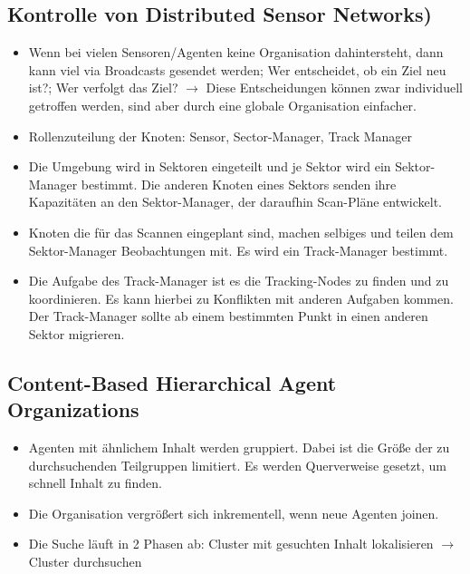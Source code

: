\documentclass{article} %
\begin{document}
	\subsection{Kontrolle von Distributed Sensor Networks)}
		\begin{itemize}
		\item Wenn bei vielen Sensoren/Agenten keine Organisation dahintersteht, dann kann viel via Broadcasts gesendet werden; Wer entscheidet, ob ein Ziel neu ist?; Wer verfolgt das Ziel? $\rightarrow$ Diese Entscheidungen können zwar individuell getroffen werden, sind aber durch eine globale Organisation einfacher.
		\item Rollenzuteilung der Knoten: Sensor, Sector-Manager, Track Manager
		\item Die Umgebung wird in Sektoren eingeteilt und je Sektor wird ein Sektor-Manager bestimmt. Die anderen Knoten eines Sektors senden ihre Kapazitäten an den Sektor-Manager, der daraufhin Scan-Pläne entwickelt.
		\item Knoten die für das Scannen eingeplant sind, machen selbiges und teilen dem Sektor-Manager Beobachtungen mit. Es wird ein Track-Manager bestimmt.
		\item Die Aufgabe des Track-Manager ist es die Tracking-Nodes zu finden und zu koordinieren. Es kann hierbei zu Konflikten mit anderen Aufgaben kommen. Der Track-Manager sollte ab einem bestimmten Punkt in einen anderen Sektor migrieren.
		\end{itemize}
	\subsection{Content-Based Hierarchical Agent Organizations}
		\begin{itemize}
		\item Agenten mit ähnlichem Inhalt werden gruppiert. Dabei ist die Größe der zu durchsuchenden Teilgruppen limitiert. Es werden Querverweise gesetzt, um schnell Inhalt zu finden.
		\item Die Organisation vergrößert sich inkrementell, wenn neue Agenten joinen.
		\item Die Suche läuft in 2 Phasen ab: Cluster mit gesuchten Inhalt lokalisieren $\rightarrow$ Cluster durchsuchen
		\end{itemize}
\end{document}
